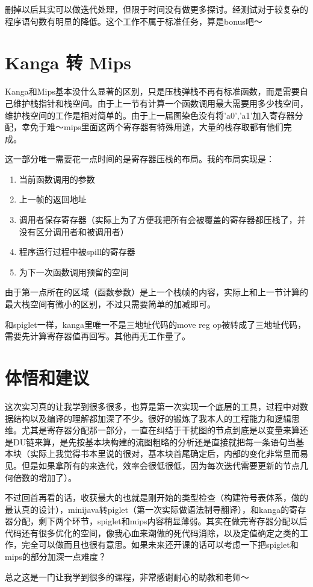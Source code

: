 \documentclass[10pt,a4paper]{article}
\begin{document}
删掉以后其实可以做迭代处理，但限于时间没有做更多探讨。经测试对于较复杂的程序语句数有明显的降低。这个工作不属于标准任务，算是bonus吧～


\section{Kanga 转 Mips}

Kanga和Mips基本没什么显著的区别，只是压栈弹栈不再有标准函数，而是需要自己维护栈指针和栈空间。由于上一节有计算一个函数调用最大需要用多少栈空间，维护栈空间的工作是相对简单的。由于上一届图染色没有将'a0','a1'加入寄存器分配，幸免于难～mips里面这两个寄存器有特殊用途，大量的栈存取都有他们完成。

这一部分唯一需要花一点时间的是寄存器压栈的布局。我的布局实现是：
\begin{enumerate}
	\item 当前函数调用的参数
	\item 上一帧的返回地址
	\item 调用者保存寄存器（实际上为了方便我把所有会被覆盖的寄存器都压栈了，并没有区分调用者和被调用者）
	\item 程序运行过程中被spill的寄存器
	\item 为下一次函数调用预留的空间
\end{enumerate}
由于第一点所在的区域（函数参数）是上一个栈帧的内容，实际上和上一节计算的最大栈空间有微小的区别，不过只需要简单的加减即可。

和spiglet一样，kanga里唯一不是三地址代码的move reg op被转成了三地址代码，需要先计算寄存器值再回写。其他再无工作量了。


\section{体悟和建议}

这次实习真的让我学到很多很多，也算是第一次实现一个底层的工具，过程中对数据结构以及编译的理解都加深了不少。很好的锻炼了我本人的工程能力和逻辑思维。尤其是寄存器分配那一部分，一直在纠结于干扰图的节点到底是以变量来算还是DU链来算，是先按基本块构建的流图粗略的分析还是直接就把每一条语句当基本块（实际上我觉得书本里说的很对，基本块首尾确定后，内部的变化非常显而易见。但是如果拿所有的来迭代，效率会很低很低，因为每次迭代需要更新的节点几何倍数的增加了）。

不过回首再看的话，收获最大的也就是刚开始的类型检查（构建符号表体系，做的最认真的设计），minijava转piglet（第一次实际做语法制导翻译），和kanga的寄存器分配，剩下两个环节，spiglet和mips内容稍显薄弱。其实在做完寄存器分配以后代码还有很多优化的空间，像我心血来潮做的死代码消除，以及定值确定之类的工作，完全可以做而且也很有意思。如果未来还开课的话可以考虑一下把spiglet和mips的部分加深一点难度？

总之这是一门让我学到很多的课程，非常感谢耐心的助教和老师～
\end{document}
